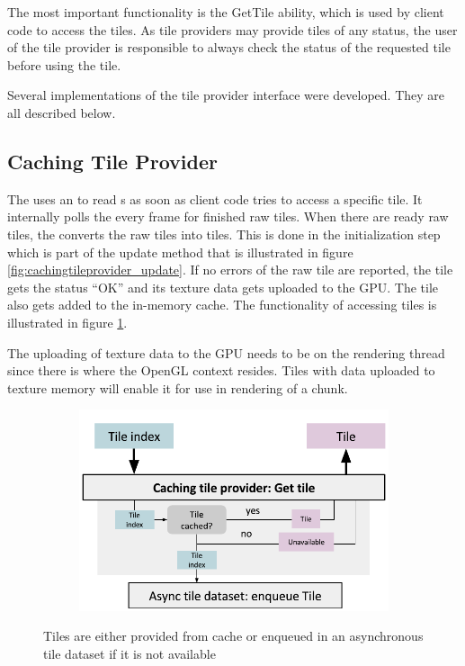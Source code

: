 The most important functionality is the GetTile ability, which is used by client code to access the tiles. As tile providers may provide tiles of any status, the user of the tile provider is responsible to always check the status of the requested tile before using the tile. 

Several implementations of the tile provider interface were developed. They are all described below.

\subsection{Caching Tile Provider}
The  uses an  to read s as soon as client code tries to access a specific tile. It internally polls the  every frame for finished raw tiles. When there are ready raw tiles, the  converts the raw tiles into tiles. This is done in the initialization step which is part of the update method that is illustrated in figure \ref{fig:cachingtileprovider_update}. If no errors of the raw tile are reported, the tile gets the status ``OK'' and its texture data gets uploaded to the GPU. The tile also gets added to the in-memory cache. The functionality of accessing tiles is illustrated in figure \ref{fig:cachingtileprovider_gettile}.

The uploading of texture data to the GPU needs to be on the rendering thread since there is where the OpenGL context resides. Tiles with data uploaded to texture memory will enable it for use in rendering of a chunk.

\begin{figure}[htbp]
    \centering
    \begin{subfigure}[bt]{0.7\textwidth}
        \includegraphics[width=\textwidth]{figures/implementation/tileprovider/cachingtileprovider_gettile.pdf}
    \end{subfigure}
    \caption{Tiles are either provided from cache or enqueued in an asynchronous tile dataset if it is not available}
    \label{fig:cachingtileprovider_gettile}
\end{figure}

